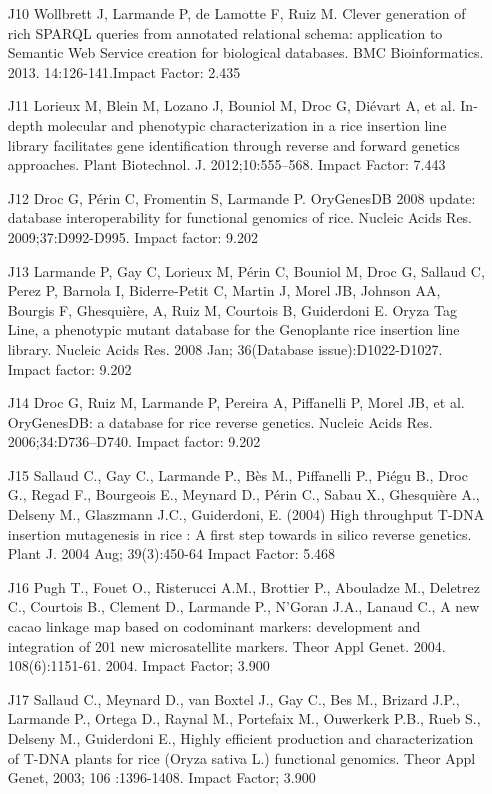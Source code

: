 \begin{itemize}
\item [J10]	Wollbrett J, Larmande P, de Lamotte F, Ruiz M. Clever generation of rich SPARQL queries from annotated relational schema: application to Semantic Web Service creation for biological databases. BMC Bioinformatics. 2013. 14:126-141.Impact Factor: 2.435
\item [J11]	Lorieux M, Blein M, Lozano J, Bouniol M, Droc G, Diévart A, et al. In-depth molecular and phenotypic characterization in a rice insertion line library facilitates gene identification through reverse and forward genetics approaches. Plant Biotechnol. J. 2012;10:555–568. Impact Factor: 7.443
\item [J12]	Droc G, Périn C, Fromentin S, Larmande P. OryGenesDB 2008 update: database interoperability for functional genomics of rice. Nucleic Acids Res. 2009;37:D992-D995. Impact factor: 9.202
\item [J13]	Larmande P, Gay C, Lorieux M, Périn C, Bouniol M, Droc G, Sallaud C, Perez P, Barnola I, Biderre-Petit C, Martin J, Morel JB, Johnson AA, Bourgis F, Ghesquière, A, Ruiz M, Courtois B, Guiderdoni E. Oryza Tag Line, a phenotypic mutant database for the Genoplante rice insertion line library. Nucleic Acids Res. 2008 Jan; 36(Database issue):D1022-D1027. Impact factor: 9.202
\item [J14]	Droc G, Ruiz M, Larmande P, Pereira A, Piffanelli P, Morel JB, et al. OryGenesDB: a database for rice reverse genetics. Nucleic Acids Res. 2006;34:D736–D740. Impact factor: 9.202
\item [J15]	Sallaud C., Gay C., Larmande P., Bès M., Piffanelli P., Piégu B., Droc G., Regad F., Bourgeois E., Meynard D., Périn C., Sabau X., Ghesquière A., Delseny M., Glaszmann J.C., Guiderdoni, E. (2004) High throughput T-DNA insertion mutagenesis in rice : A first step towards in silico reverse genetics. Plant J. 2004 Aug; 39(3):450-64  Impact Factor: 5.468 
\item [J16]	Pugh T., Fouet O., Risterucci A.M., Brottier P., Abouladze M., Deletrez C., Courtois B., Clement D., Larmande P., N'Goran J.A., Lanaud C., A new cacao linkage map based on codominant markers: development and integration of 201 new microsatellite markers. Theor Appl Genet. 2004. 108(6):1151-61. 2004. Impact Factor; 3.900
\item [J17]	Sallaud C., Meynard D., van Boxtel J., Gay C., Bes M., Brizard J.P., Larmande P., Ortega D., Raynal M., Portefaix M., Ouwerkerk P.B., Rueb S., Delseny M., Guiderdoni E.,  Highly efficient production and characterization of T-DNA plants for rice (Oryza sativa L.) functional genomics. Theor Appl Genet, 2003; 106 :1396-1408. Impact Factor; 3.900
\end{itemize}

